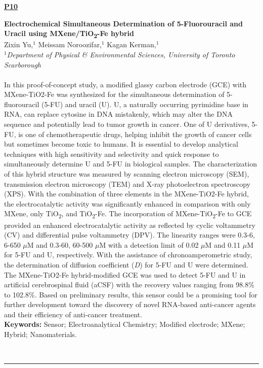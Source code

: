 \documentclass[titlepage,oneside,openany,10pt]{book}
\newenvironment{posterabs}[4] %
        {
	\begin{flushright}
                \underline{\textbf{#4}}
        \end{flushright}
        \textbf{#1}\\%
        #2\\%
        \textit{#3}\\\\%
        }
        {
        \\
        \noindent\rule{15cm}{0.5pt}%
        }
\begin{document}
\begin{posterabs}
	{Electrochemical Simultaneous Determination of 5-Fluorouracil and Uracil using MXene/TiO\textsubscript{2}-Fe hybrid}
	{Zixin Yu,$^{1}$ Meissam Noroozifar,$^{1}$ Kagan Kerman,$^{1}$}
	{
	$^{1}$Department of Physical \& Environmental Sciences, University of Toronto Scarborough
	}
	{P10}
	In this proof-of-concept study, a modified glassy carbon electrode (GCE) with MXene-TiO2-Fe was synthesized for the simultaneous determination of 5-fluorouracil (5-FU) and uracil (U). U, a naturally occurring pyrimidine base in RNA, can replace cytosine in DNA mistakenly, which may alter the DNA sequence and potentially lead to tumor growth in cancer. One of U derivatives, 5-FU, is one of chemotherapeutic drugs, helping inhibit the growth of cancer cells but sometimes become toxic to humans. It is essential to develop analytical techniques with high sensitivity and selectivity and quick response to simultaneously determine U and 5-FU in biological samples. The characterization of this hybrid structure was measured by scanning electron microscopy (SEM), transmission electron microscopy (TEM) and X-ray photoelectron spectroscopy (XPS). With the combination of three elements in the MXene-TiO2-Fe hybrid, the electrocatalytic activity was significantly enhanced in comparison with only MXene, only TiO\textsubscript{2}, and TiO\textsubscript{2}-Fe. The incorporation of MXene-TiO\textsubscript{2}-Fe to GCE provided an enhanced electrocatalytic activity as reflected by cyclic voltammetry (CV) and differential pulse voltammetry (DPV). The linearity ranges were 0.3-6, 6-650 $\mu$M and 0.3-60, 60-500 $\mu$M with a detection limit of 0.02 $\mu$M and 0.11 $\mu$M for 5-FU and U, respectively. With the assistance of chronoamperometric study, the determination of diffusion coefficient (\emph{D}) for 5-FU and U were determined. The MXene-TiO2-Fe hybrid-modified GCE was used to detect 5-FU and U in artificial cerebrospinal fluid (aCSF) with the recovery values ranging from 98.8\% to 102.8\%. Based on preliminary results, this sensor could be a promising tool for further development toward the discovery of novel RNA-based anti-cancer agents and their efficiency of anti-cancer treatment.\\\textbf{Keywords:} Sensor; Electroanalytical Chemistry; Modified electrode; MXene; Hybrid; Nanomaterials.
	\label{YuZ}
\end{posterabs}
\end{document}
